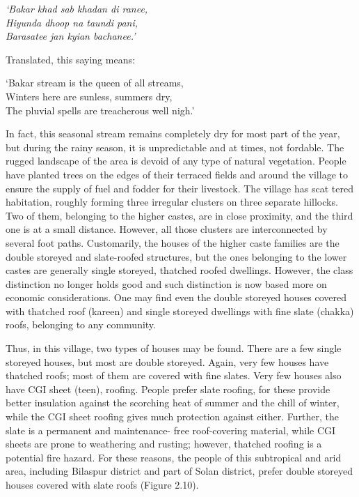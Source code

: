 \begin{myquote}
\textit{‘Bakar khad sab khadan di ranee,} \\\textit{Hiyunda dhoop na taundi pani,} \\\textit{Barasatee jan kyian bachanee.’}
\end{myquote}

\newpage

Translated, this saying means:

\begin{myquote}
‘Bakar stream is the queen of all streams,\\ Winters here are sunless, summers dry,\\ The pluvial spells are treacherous well nigh.’
\end{myquote}

In fact, this seasonal stream remains completely dry for most part of the year, but during the rainy season, it is unpredictable and at times, not fordable. The rugged landscape of the area is devoid of any type of natural vegetation. People have planted trees on the edges of their terraced fields and around the village to ensure the supply of fuel and fodder for their livestock. The village has scat tered habitation, roughly forming three irregular clusters on three separate hillocks. Two of them, belonging to the higher castes, are in close proximity, and the third one is at a small distance. However, all those clusters are interconnected by several foot paths. Customarily, the houses of the higher caste families are the double storeyed and slate-roofed structures, but the ones belonging to the lower castes are generally single storeyed, thatched roofed dwellings. However, the class distinction no longer holds good and such distinction is now based more on economic considerations. One may find even the double storeyed houses covered with thatched roof (kareen) and single storeyed dwellings with fine slate (chakka) roofs, belonging to any community.

Thus, in this village, two types of houses may be found. There are a few single storeyed houses, but most are double storeyed. Again, very few houses have thatched roofs; most of them are covered with fine slates. Very few houses also have CGI sheet (teen), roofing. People prefer slate roofing, for these provide better insulation against the scorching heat of summer and the chill of winter, while the CGI sheet roofing gives much protection against either. Further, the slate is a permanent and maintenance- free roof-covering material, while CGI sheets are prone to weathering and rusting; however, thatched roofing is a potential fire hazard. For these reasons, the people of this subtropical and arid area, including Bilaspur district and part of Solan district, prefer double storeyed houses covered with slate roofs (Figure 2.10).

